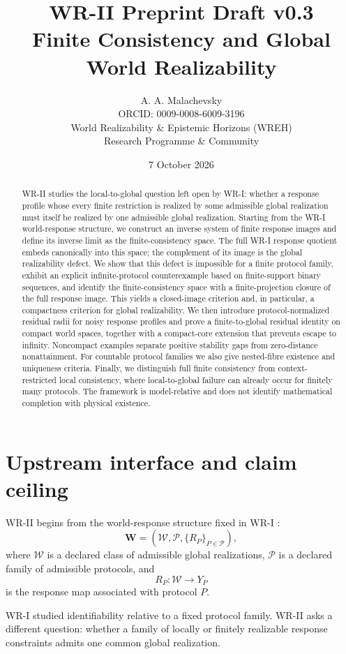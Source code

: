 \documentclass[11pt]{article}
\title{\textbf{WR-II Preprint Draft v0.3}\\[4pt]
\large Finite Consistency and Global World Realizability}
\author{A. A. Malachevsky\\
ORCID: 0009-0008-6009-3196\\
World Realizability \& Epistemic Horizons (WREH)\\
Research Programme \& Community}
\date{7 October 2026}
\newcommand{\W}{\mathcal W}
\newcommand{\Pcal}{\mathcal P}
\begin{document}
\maketitle

\begin{abstract}
WR-II studies the local-to-global question left open by WR-I: whether a response
profile whose every finite restriction is realized by some admissible global
realization must itself be realized by one admissible global realization.
Starting from the WR-I world-response structure, we construct an inverse system
of finite response images and define its inverse limit as the finite-consistency
space. The full WR-I response quotient embeds canonically into this space; the
complement of its image is the global realizability defect. We show that this
defect is impossible for a finite protocol family, exhibit an explicit
infinite-protocol counterexample based on finite-support binary sequences, and
identify the finite-consistency space with a finite-projection closure of the
full response image. This yields a closed-image criterion and, in particular,
a compactness criterion for global realizability. We then introduce
protocol-normalized residual radii for noisy response profiles and prove a
finite-to-global residual identity on compact world spaces, together with a
compact-core extension that prevents escape to infinity. Noncompact examples
separate positive stability gaps from zero-distance nonattainment. For
countable protocol families we also give nested-fibre existence and uniqueness
criteria. Finally, we distinguish full finite consistency from
context-restricted local consistency, where local-to-global failure can already
occur for finitely many protocols. The framework is model-relative and does
not identify mathematical completion with physical existence.
\end{abstract}

\section{Upstream interface and claim ceiling}

WR-II begins from the world-response structure fixed in WR-I
\cite{MalachevskyWRI}:
\[
\mathbf W=(\W,\Pcal,\{R_P\}_{P\in\Pcal}),
\]
where $\W$ is a declared class of admissible global realizations, $\Pcal$ is a
declared family of admissible protocols, and
\[
R_P:\W\to Y_P
\]
is the response map associated with protocol $P$.

WR-I studied identifiability relative to a fixed protocol family. WR-II asks a
different question: whether a family of locally or finitely realizable response
constraints admits one common global realization.
\end{document}
